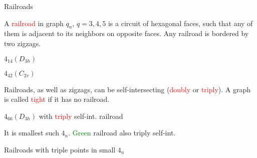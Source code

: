 \documentclass[%
pdf,
colorBG,
slideColor,
]{prosper}
\begin{document}
\begin{slide}{Railroads}

A \textcolor{red}{railroad} in graph $q_n$, $q=3, 4, 5$ is a circuit of hexagonal faces, such that any of them is adjacent to its neighbors on opposite faces. Any railroad is bordered by two zigzags.

\begin{center}
\begin{minipage}{5.5cm}
\centering
{}\par
$4_{14}(D_{3h})$
\end{minipage}
\begin{minipage}{5.5cm}
\centering
{}\par
$4_{42}(C_{2v})$
\end{minipage}
\end{center}

Railroads, as well as zigzags, can be self-intersecting (\textcolor{red}{doubly} or \textcolor{red}{triply}). A graph is called \textcolor{red}{tight} if it has no railroad.



\end{slide}


\begin{slide}{$4_{66}(D_{3h})$ with \textcolor{red}{triply} self-int. railroad}

\vspace{-2mm}
\begin{center}
\centering
{}\par
It is smallest such $4_n$. \textcolor{green}{Green} railroad also triply self-int.
\end{center}




\end{slide}






\begin{slide}{Railroads with triple points in small $4_n$}

\vspace{-2mm}
\begin{center}
\end{center}

\end{slide}
\end{document}
